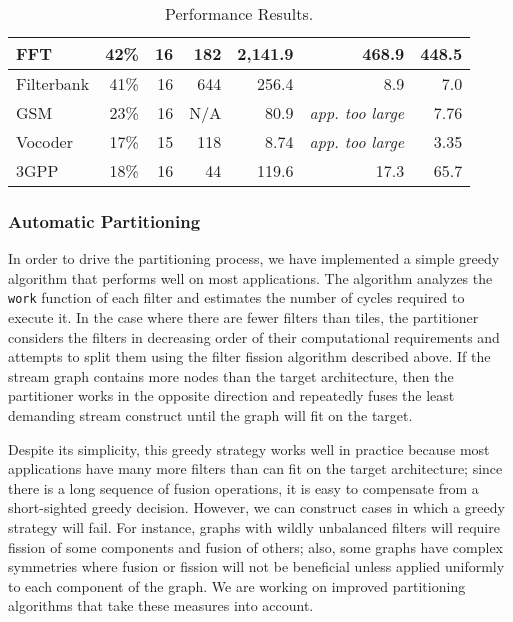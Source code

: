 \begin{table*}[!t]
\begin{center}
\begin{tabular}{|l||r|r|r|r||r||r||}
FFT    & 42\% & 16  & 182 &  2,141.9 & 468.9 & 448.5  \\ \hline
Filterbank & 
       41\% & 16  &  644 &   256.4  & 8.9 & 7.0   \\ \hline
GSM    & 23\% & 16 & N/A &    80.9  & {\it app. too large} & 7.76 \\ \hline
Vocoder& 17\% & 15  & 118 &     8.74  & {\it app. too large} & 3.35  \\ \hline
3GPP   & 18\% & 16  & 44 &   119.6  & 17.3  & 65.7   \\ \hline \hline
\end{tabular}
\caption{\protect\small Performance Results.}
\label{tab:performance}
\vspace{-5pt}
\end{center}
\end{table*}

\subsubsection{Automatic Partitioning}

In order to drive the partitioning process, we have implemented a
simple greedy algorithm that performs well on most applications.  The
algorithm analyzes the {\tt work} function of each filter and
estimates the number of cycles required to execute it.  
In the case where there are fewer filters than tiles, the partitioner
considers the filters in decreasing order of their computational
requirements and attempts to split them using the filter fission
algorithm described above.  
If the stream graph contains more nodes than the target architecture,
then the partitioner works in the opposite direction and repeatedly
fuses the least demanding stream construct until the graph will fit on
the target.  

Despite its simplicity, this greedy strategy works well in practice
because most applications have many more filters than can fit on the
target architecture; since there is a long sequence of fusion
operations, it is easy to compensate from a short-sighted greedy
decision.  However, we can construct cases in which a greedy strategy
will fail.  For instance, graphs with wildly unbalanced filters will
require fission of some components and fusion of others; also, some
graphs have complex symmetries where fusion or fission will not be
beneficial unless applied uniformly to each component of the graph.
We are working on improved partitioning algorithms that take these
measures into account.

